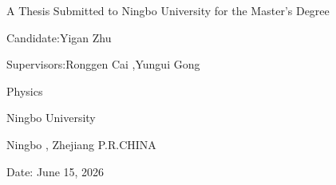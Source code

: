 \vspace*{4em}

\begin{center}

{\Large A Thesis Submitted to Ningbo University for the Master's Degree\textbf{} \par}

\vspace{10em}


{\LARGE \thesistitleEN{}\par}

\vspace{10em}

{\large Candidate:\quad Yigan Zhu\par}
\vspace{0.8em}
{\large Supervisors:\quad Ronggen Cai ,\quad Yungui Gong \par}

\vspace{3cm}

{\large Physics\par}
\vspace{0.4em}
{\large Ningbo University\par}
\vspace{0.4em}
{\large Ningbo , \qquad Zhejiang \quad P.R.CHINA\par}

\vspace{2em}

{\large Date: \quad  June 15, 2026 \quad {}\par}

\end{center}

\restoregeometry
